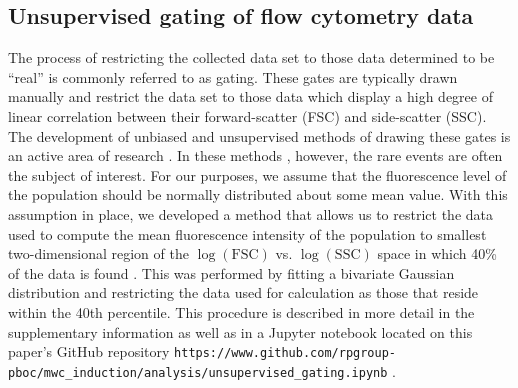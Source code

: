 \subsection*{Unsupervised gating of flow cytometry data}
The process of restricting the collected data set to those data determined to
be ``real'' is commonly referred to as gating. These gates are typically drawn
manually \cite{Maecker2005} and restrict the data set to those data  which
display a high degree of linear correlation  between their forward-scatter
(FSC) and side-scatter (SSC). The development of unbiased and unsupervised
methods of drawing these gates is an active area of research
\cite{Agaheepour2013, Lo2008}. In these methods , however, the rare events are
often the subject of interest. For our purposes, we assume that the
fluorescence level of the population should be normally distributed about some
mean value. With this  assumption in place, we developed a method that allows
us to restrict the data used  to compute the mean fluorescence intensity of the
population to smallest two-dimensional  region of the $\log(\mathrm{FSC})$ vs.
$\log(\mathrm{SSC})$ space in which 40\% of the data is found . This  was
performed by fitting a bivariate Gaussian distribution and restricting the
data used for calculation as those that reside within the 40th percentile.
 This procedure is  described in
more detail in the supplementary information as well as in a  Jupyter notebook
located on this paper's GitHub repository
\texttt{https://www.github.com/rpgroup-pboc/mwc\_induction/analysis/unsupervised\_gating.ipynb} .

